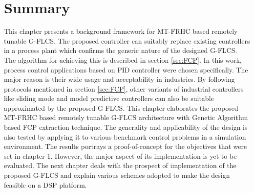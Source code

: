 \section{Summary}
This chapter presents a background framework for MT-FRHC based remotely tunable G-FLCS. The proposed controller can suitably replace existing controllers in a process plant which confirms the generic nature of the designed G-FLCS. The algorithm for achieving this is described in section \ref{sec:FCP}. In this work, process control applications based on PID controller were chosen specifically. The major reason is their wide usage and acceptability in industries. By following protocols mentioned in section \ref{sec:FCP}, other variants of industrial controllers like sliding mode and model predictive controllers can also be suitable approximated by the proposed G-FLCS. This chapter elaborates the proposed MT-FRHC based remotely tunable G-FLCS architecture with Genetic Algorithm based FCP extraction technique. The generality and applicability of the design is also tested by applying it to various benchmark control problems in a simulation environment. The results portrays a proof-of-concept for the objectives that were set in chapter 1. However, the major aspect of its implementation is yet to be evaluated. The next chapter deals with the prospect of implementation of the proposed G-FLCS and explain various schemes adopted to make the design feasible on a DSP platform.  



